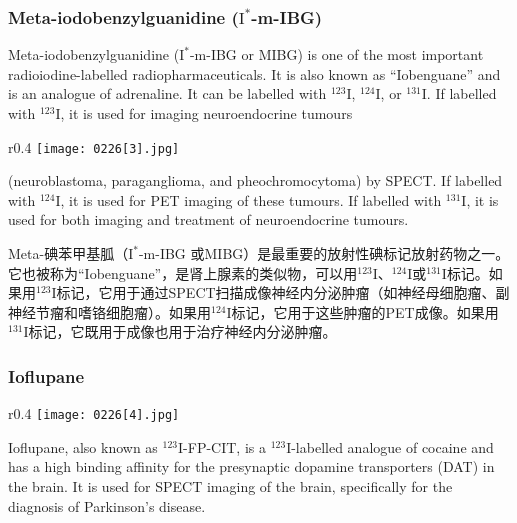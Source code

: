 \documentclass[dvipsnames, svgnames,a4paper,11pt]{article}
\begin{document}
\subsubsection{Meta-iodobenzylguanidine (\(\mathrm{I^{*}}\)-m-IBG)}  
Meta-iodobenzylguanidine (\(\mathrm{I^{*}}\)-m-IBG or MIBG) is one of the most important radioiodine-labelled radiopharmaceuticals. It is also known as “Iobenguane” and is an analogue of adrenaline. It can be labelled with \(\mathrm{^{123}I}\), \(\mathrm{^{124}I}\), or \(\mathrm{^{131}I}\).
If labelled with \(\mathrm{^{123}I}\), it is used for imaging 
neuroendocrine tumours
\begin{wrapfigure}{r}{0.4\textwidth}
    \centering
    \texttt{[image: 0226[3].jpg]}
     \label{fig299}
\end{wrapfigure}
(neuroblastoma, paraganglioma, and pheochromocytoma) by SPECT. If labelled with \(\mathrm{^{124}I}\), it is used for PET imaging of these tumours. If labelled with \(\mathrm{^{131}I}\), it is used for both imaging and treatment of neuroendocrine tumours.



Meta-碘苯甲基胍（\(\mathrm{I^{*}}\)-m-IBG 或MIBG）是最重要的放射性碘标记放射药物之一。它也被称为“Iobenguane”，是肾上腺素的类似物，可以用\(\mathrm{^{123}I}\)、\(\mathrm{^{124}I}\)或\(\mathrm{^{131}I}\)标记。如果用\(\mathrm{^{123}I}\)标记，它用于通过SPECT扫描成像神经内分泌肿瘤（如神经母细胞瘤、副神经节瘤和嗜铬细胞瘤）。如果用\(\mathrm{^{124}I}\)标记，它用于这些肿瘤的PET成像。如果用\(\mathrm{^{131}I}\)标记，它既用于成像也用于治疗神经内分泌肿瘤。

\subsubsection{Ioflupane}  

\begin{wrapfigure}{r}{0.4\textwidth}
    \centering
    \texttt{[image: 0226[4].jpg]}
     \label{fig300}
\end{wrapfigure}

Ioflupane, also known as \(\mathrm{^{123}I}\)-FP-CIT, is a \(\mathrm{^{123}I}\)-labelled analogue of cocaine and has a high binding affinity for the presynaptic dopamine transporters (DAT) in the brain. It is used for SPECT imaging of the brain, specifically for the diagnosis of Parkinson's disease.
\end{document}
